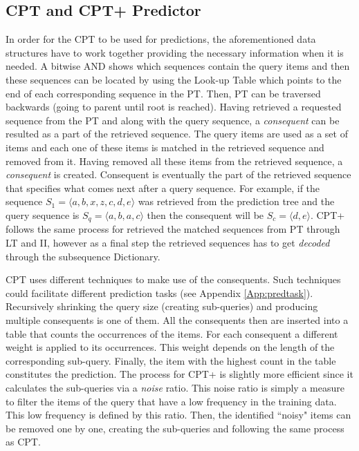 \subsection{CPT and CPT+ Predictor}
In order for the CPT to be used for predictions, the aforementioned data structures have to work together providing the necessary information when it is needed. A bitwise AND shows which sequences contain the query items and then these sequences can be located by using the Look-up Table which points to the end of each corresponding sequence in the PT. Then, PT can be traversed backwards (going to parent until root is reached). Having retrieved a requested sequence from the PT and along with the query sequence, a \emph{consequent} can be resulted as a part of the retrieved sequence. The query items are used as a set of items and each one of these items is matched in the retrieved sequence and removed from it. Having removed all these items from the retrieved sequence, a \emph{consequent} is created. Consequent is eventually the part of the retrieved sequence that specifies what comes next after a query sequence. For example, if the sequence \(S_1=\langle a, b, x, z, c, d, e\rangle\) was retrieved from the prediction tree and the query sequence is \(S_q=\langle a, b, a, c\rangle\) then the consequent will be \(S_c=\langle d, e\rangle\). CPT+ follows the same process for retrieved the matched sequences from PT through LT and II, however as a final step the retrieved sequences has to get \emph{decoded} through the subsequence Dictionary.
\par CPT uses different techniques \cite{gueniche_fournier-viger_tseng_2013} to make use of the consequents. Such techniques could facilitate different prediction tasks (see Appendix \ref{App:predtask}). Recursively shrinking the query size (creating sub-queries) and producing multiple consequents is one of them. All the consequents then are inserted into a table that counts the occurrences of the items. For each consequent a different weight is applied to its occurrences. This weight depends on the length of the corresponding sub-query. Finally, the item with the highest count in the table constitutes the prediction. The process for CPT+ is slightly more efficient since it calculates the sub-queries via a \emph{noise} ratio. This noise ratio is simply a measure to filter the items of the query that have a low frequency in the training data. This low frequency is defined by this ratio. Then, the identified ``noisy" items can be removed one by one, creating the sub-queries and following the same process as CPT.

